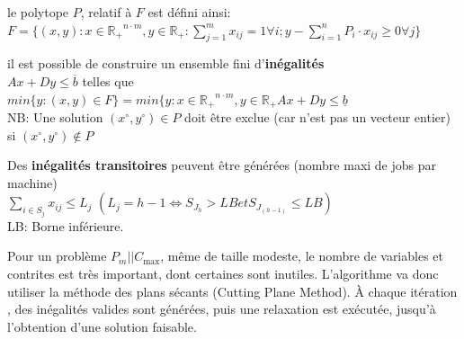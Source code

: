 \documentclass[a4paper,12pt]{report}
\theoremstyle{plain}				%
\theoremstyle{definition}				%
\newcommand\problemGraham{$P_m||C_{\max}$}
\begin{document}
\bigskip
le polytope $P$, relatif à $F$ est défini ainsi: \\
$F=\{ (x,y) : x \in \mathbb{R_+}^{n \cdot m}, y \in \mathbb{R_+} : \sum_{j=1}^{m} x_{ij}=1 \forall i;
y-\sum_{i=1}^{n} P_i \cdot x_{ij} \geq 0 \forall j	\}$

\bigskip
il est possible de construire un ensemble fini d'\textbf{inégalités} \\
$Ax+Dy \leq \overline{b}$ telles que \\
$min \{y : (x,y) \in F \} = min \{y : x \in \mathbb{R_+}^{n \cdot m}, y \in \mathbb{R_+} Ax+Dy \leq \underline{b}$ \\
NB: Une solution $(x \ensuremath{^\circ} , y\ensuremath{^\circ}) \in P$ doit être exclue (car n'est pas un vecteur entier) si $(x\ensuremath{^\circ}, y\ensuremath{^\circ}) \notin P $

\bigskip
Des \textbf{inégalités transitoires} peuvent être générées (nombre maxi de jobs par machine) \\
$\sum_{i \in S_j} x_{ij} \leq L_j$ \quad $(L_j = h-1 \iff S_{J_h} > LB et S_{J_{(h-1)}} \leq LB)$\\
LB: Borne inférieure.

\bigskip

Pour un problème \problemGraham, même de taille modeste, le nombre de
variables et contrites est très important, dont certaines sont
inutiles.
L'algorithme va donc utiliser la méthode des plans sécants (Cutting
Plane Method).
\`A chaque itération , des inégalités valides sont générées, puis une
relaxation est exécutée, jusqu'à l'obtention d'une solution faisable.
\end{document}
